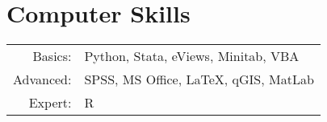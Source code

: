 \documentclass[a4paper,10pt]{article} %
\begin{document}
\section{Computer Skills}
\begin{tabular}{rl}
Basics: & Python, Stata, eViews, Minitab, VBA\\

Advanced: & SPSS, MS Office, LaTeX, qGIS, MatLab\\

Expert: & R
\end{tabular}



\end{document}
